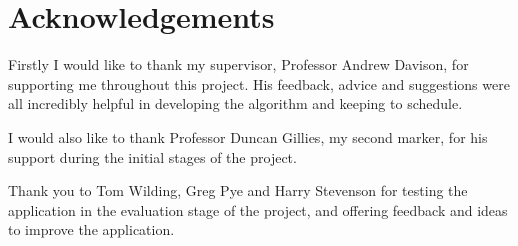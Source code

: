 \section*{Acknowledgements}

Firstly I would like to thank my supervisor, Professor Andrew Davison, for supporting me throughout this project. His feedback, advice and suggestions were all incredibly helpful in developing the algorithm and keeping to schedule.

I would also like to thank Professor Duncan Gillies, my second marker, for his support during the initial stages of the project.

Thank you to Tom Wilding, Greg Pye and Harry Stevenson for testing the application in the evaluation stage of the project, and offering feedback and ideas to improve the application.